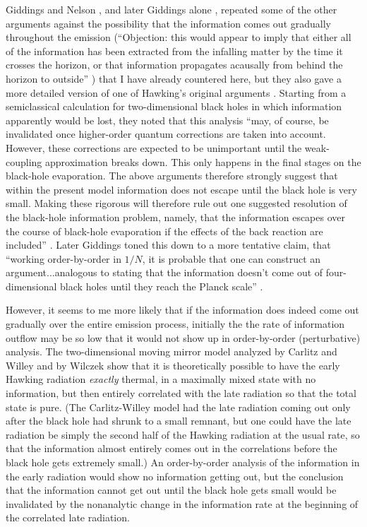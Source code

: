      Giddings and Nelson \cite{GidNel}, and later Giddings alone
\cite{Gid92b},
repeated some of the other arguments against the possibility that the
information comes out gradually throughout the emission (``Objection:
this
would appear to imply that either all of the information has been
extracted
from the infalling matter by the time it crosses the horizon, or that
information propagates acausally from behind the horizon to outside''
\cite{Gid92b}) that I have already countered here, but they also gave
a more
detailed version of one of Hawking's original arguments \cite{Haw76}.
Starting
from a semiclassical calculation for two-dimensional black holes in
which
information apparently would be lost, they noted that this analysis
``may, of
course, be invalidated once higher-order quantum corrections are
taken into
account.  However, these corrections are expected to be unimportant
until the
weak-coupling approximation breaks down.  This only happens in the
final stages
on the black-hole evaporation.  The above arguments therefore
strongly suggest
that within the present model information does not escape until the
black hole
is very small.  Making these rigorous will therefore rule out one
suggested
resolution of the black-hole information problem, namely, that the
information
escapes over the course of black-hole evaporation if the effects of
the back
reaction are included'' \cite{GidNel}.  Later Giddings toned this
down to a
more
tentative claim, that ``working order-by-order in $1/N$, it is
probable that
one can construct an argument...analogous to stating that the
information
doesn't come out of four-dimensional black holes until they reach the
Planck
scale'' \cite{Gid92b}.

     However, it seems to me more likely that if the information does
indeed
come out gradually over the entire emission process, initially the
the rate of
information outflow may be so low that it would not show up in
order-by-order
(perturbative) analysis.  The two-dimensional moving mirror model
\cite{DavFul} analyzed by Carlitz and Willey \cite{CW2}
and by Wilczek \cite{Wil} show that it is
theoretically possible to have the early Hawking radiation {\it
exactly}
thermal, in a maximally mixed state with no information, but then
entirely
correlated with the late radiation so that the total state is pure.
(The
Carlitz-Willey model had the late radiation coming out only after the
black
hole had shrunk to a small remnant, but one could have the late
radiation be
simply the second half of the Hawking radiation at the usual rate, so
that the
information almost entirely comes out in the correlations before the
black hole
gets extremely small.)  An order-by-order analysis of the information
in the
early radiation would show no information getting out, but the
conclusion that
the information cannot get out until the black hole gets small would
be
invalidated by the nonanalytic change in the information rate at the
beginning
of the correlated late radiation.

